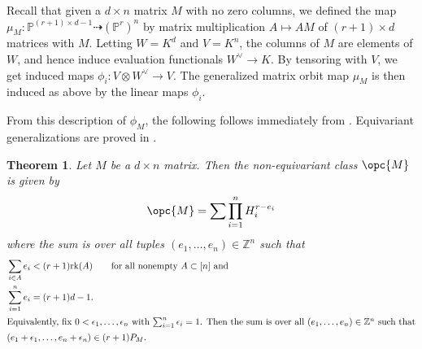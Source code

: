 \documentclass[12pt]{amsart}
\newcommand{\mb}{\mathbb}
\newcommand{\rk}{{\rm rk}}
\theoremstyle{plain}
\newtheorem{Thm}{Theorem}[section]
\theoremstyle{definition}
\theoremstyle{remark}
\begin{document}
Recall that given a $d \times n$ matrix $M$ with no zero columns, we defined the map $\mu_M:\mb{P}^{(r+1) \times d-1} \dashrightarrow (\mb{P}^r)^n$ by matrix multiplication $A \mapsto AM$ of $(r+1)\times d$ matrices with $M$. Letting $W=K^d$ and $V=K^n$, the columns of $M$ are elements of $W$, and hence induce evaluation functionals $W^\vee \to K$. By tensoring with $V$, we get induced maps $\phi_i:V \otimes W^\vee \to V$. The generalized matrix orbit map $\mu_M$ is then induced as above by the linear maps $\phi_i$.



From this description of $\phi_M$, the following follows immediately from . Equivariant generalizations are proved in .

\begin{Thm}
\label{NE} Let $M$ be a $d\times n$ matrix. Then the non-equivariant class $\opc{M}$ is given by $$\opc{M}=\sum \prod_{i=1}^n H_i^{r-e_i}$$
where the sum is over all tuples $(e_1, \ldots, e_n)\in \mb{Z}^n$ such that
\begin{align*}
&\sum_{i \in A} e_i < (r+1)\rk(A)\qquad\text{for all nonempty $A\subset [n]$ and} \\&\sum_{i=1}^n e_i = (r+1)d-1. \\\intertext{Equivalently, fix $0<\epsilon_1,\ldots,\epsilon_n$ with $\sum_{i=1}^n \epsilon_i=1$. Then the sum is over all $(e_1, \ldots, e_n)\in \mb{Z}^n$ such that}
&(e_1+\epsilon_1, \ldots, e_n + \epsilon_n) \in (r+1)P_M. \end{align*}
\end{Thm}
\end{document}
